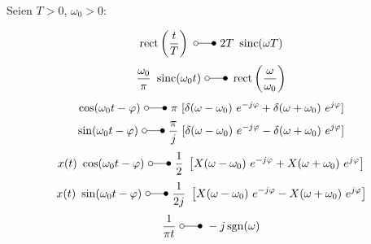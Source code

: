 \documentclass[a4paper, 11pt]{article}
\newcommand{\ftransform}{~\laplace~}
\DeclareMathOperator{\sinc}{sinc}
\DeclareMathOperator{\sgn}{sgn}
\DeclareMathOperator{\rect}{rect}
\begin{document}
Seien $T > 0$, $\omega_0 > 0$:
\begin{multicols}{2}
	\[ \rect \left(\frac{t}{T} \right) \ftransform 2 T ~ \sinc(\omega T) \]
	\[ \frac{\omega_0}{\pi} ~ \sinc(\omega_0 t) \ftransform \rect \left( \frac{\omega}{\omega_0} \right) \]
	\[ \cos(\omega_0 t - \varphi) \ftransform \pi ~ [\delta(\omega - \omega_0) ~ e^{-j \varphi} + \delta(\omega + \omega_0) ~ e^{j \varphi}] \]
	\[ \sin(\omega_0 t - \varphi) \ftransform \frac{\pi}{j} ~ [\delta(\omega - \omega_0) ~ e^{-j \varphi} - \delta(\omega + \omega_0) ~ e^{j \varphi}] \]
	\[ x(t) ~ \cos(\omega_0 t - \varphi) \ftransform \frac{1}{2} ~ \left[X(\omega - \omega_0) ~ e^{-j \varphi} + X(\omega + \omega_0) ~ e^{j \varphi} \right]\]
	\[ x(t) ~ \sin(\omega_0 t - \varphi) \ftransform \frac{1}{2j} ~ \left[X(\omega - \omega_0) ~ e^{-j \varphi} - X(\omega + \omega_0) ~ e^{j \varphi} \right]\]
	\[ \frac{1}{\pi t} \ftransform - j \sgn(\omega)\]
\end{multicols}


\end{document}
